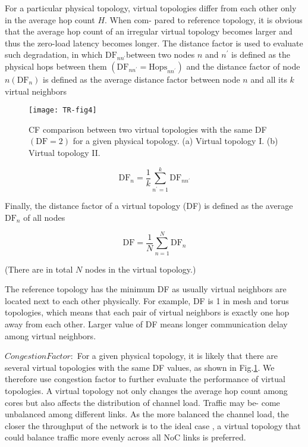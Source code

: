 For a particular physical topology, virtual topologies differ from each other only in the average hop count $H$. When com- pared to reference topology, it is obvious that the average hop count of an irregular virtual topology becomes larger and thus the zero-load latency becomes longer. The distance factor is used to evaluate such degradation, in which $\mathrm{DF}_{n n^{\prime}}$between two nodes $n$ and $ n^{\prime}$ is defined as the physical hops between them $\left(\mathrm{DF}_{n n^{\prime}}=\mathrm{Hops}_{n n^{\prime}}\right)$ and the distance factor of node $n\left(\mathrm{DF}_{n}\right)$ is defined as the average distance factor between node $n$   and all its $k$ virtual neighbors

\begin{figure}[t]
    \centering
        \texttt{[image: TR-fig4]}
          \caption{ CF comparison between two virtual topologies with the same DF $(\mathrm{DF}=2)$ for a given physical topology. (a) Virtual topology I. (b) Virtual topology II.}
             \label{fig4}
\end{figure}

\begin{equation}
    \mathrm{DF}_{n}=\frac{1}{k} \sum_{n^{\prime}=1}^{k} \mathrm{DF}_{n n^{\prime}}
            \label{eq1}
\end{equation}

Finally, the distance factor of a virtual topology (DF) is defined as the average $\mathrm{DF}_{n}$ of all nodes

\begin{equation}
    \mathrm{DF}=\frac{1}{N} \sum_{n=1}^{N} \mathrm{DF}_{n}
            \label{eq2}
\end{equation}

(There are in total $N$ nodes in the virtual topology.)

The reference topology has the minimum DF as usually virtual neighbors are located next to each other physically. For example, DF is 1 in mesh and torus topologies, which means that each pair of virtual neighbors is exactly one hop away from each other. Larger value of DF means longer communication delay among virtual neighbors.

$Congestion Factor:$ For a given physical topology, it is likely that there are several virtual topologies with the same DF values, as shown in Fig.\ref{fig4}. We therefore use congestion factor to further evaluate the performance of virtual topologies. A virtual topology not only changes the average hop count among cores but also affects the distribution of channel load. Traffic may be- come unbalanced among different links. As the more balanced the channel load, the closer the throughput of the network is to the ideal case \cite{dally2004principles}, a virtual topology that could balance traffic more evenly across all NoC links is preferred.


